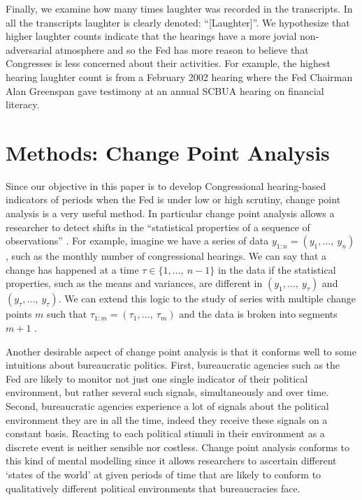 \documentclass[a4paper]{article}\usepackage[]{graphicx}\usepackage[]{color}
\begin{document}
Finally, we examine how many times laughter was recorded in the transcripts. In all the transcripts laughter is clearly denoted: ``[Laughter]''. We hypothesize that higher laughter counts indicate that the hearings have a more jovial non-adversarial atmosphere and so the Fed has more reason to believe that Congresses is less concerned about their activities. For example, the highest hearing laughter count is from a February 2002 hearing where the Fed Chairman Alan Greenspan gave testimony at an annual SCBUA hearing on financial literacy.

\section{Methods: Change Point Analysis}

Since our objective in this paper is to develop Congressional hearing-based indicators of periods when the Fed is under low or high scrutiny, change point analysis is a very useful method. In particular change point analysis allows a researcher to detect shifts in the ``statistical properties of a sequence of observations'' \cite[2]{Killick2013}. For example, imagine we have a series of data $y_{1:n} = (y_{1},\ldots,\: y_{n})$, such as the monthly number of congressional hearings.  We can say that a change has happened at a time $\tau \in \{1,\ldots,\:n-1\}$ in the data if the statistical properties, such as the means and variances, are different in $(y_{1},\ldots,\: y_{\tau})$ and $(y_{\tau},\ldots,\: y_{\tau})$. We can extend this logic to the study of series with multiple change points $m$ such that $\tau_{1:m} = (\tau_{1},\ldots,\:\tau_{m})$ and the data is broken into segments $m + 1$ \citep{Killick2012}.

Another desirable aspect of change point analysis is that it conforms well to some intuitions about bureaucratic politics. First, bureaucratic agencies such as the Fed are likely to monitor not just one single indicator of their political environment, but rather several such signals, simultaneously and over time. Second, bureaucratic agencies experience a lot of signals about the political environment they are in all the time, indeed they receive these signals on a constant basis. Reacting to each political stimuli in their environment as a discrete event is neither sensible nor costless. Change point analysis conforms to this kind of mental modelling since it allows researchers to ascertain different ‘states of the world’ at given periods of time that are likely to conform to qualitatively different political environments that bureaucracies face.
\end{document}
